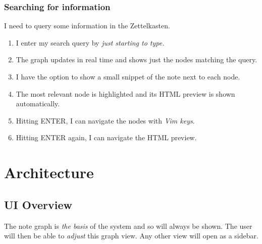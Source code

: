 \documentclass{article}
\begin{document}
\subsubsection{Searching for information}

I need to query some information in the Zettelkasten.

\begin{enumerate}
	\item I enter my search query by \emph{just starting to type.}

	\item The graph updates in real time and shows just the nodes matching the query. 

	\item I have the option to show a small snippet of the note next to each node.

	\item The most relevant node is highlighted and its HTML preview is shown automatically.

	\item Hitting ENTER, I can navigate the nodes with \emph{Vim keys}.

	\item Hitting ENTER again, I can navigate the HTML preview.
\end{enumerate}

\newpage

\section{Architecture}

\subsection{UI Overview}\label{sec:ui_layout}

The note graph is \emph{the basis} of the system and so will always be shown. The user will then be able to \emph{adjust} this graph view. Any other view will open as a sidebar.

\newcommand{\drawborder}{
	\node[fit={(0,0) (\linewidth, 0.5625\linewidth)}, draw=black, thick, outer sep=0](border){};
}

\newcommand{\uicontainer}[3]{
	\node[fit={#1 #2}, inner sep=0, outer sep=0](#3){};
}

\newcommand{\uielement}[5]{
	\uicontainer{#1}{#2}{#4}

	\node[fit={(#4.north west) (#4.south east)}, draw=#3, fill=#3, fill opacity=0.05, thick, inner sep=-0.3]{};
	\node[text=#3] at (#4){#5};
}
\end{document}
